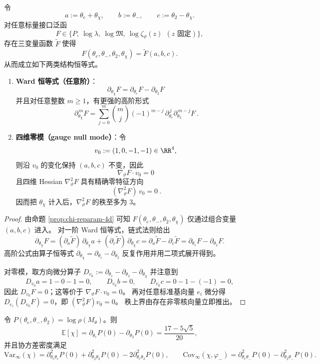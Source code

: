\begin{corollary}\label{cor:chi-gauge-ward-nullmode}
令
$$
a:=\theta_e+\theta_\chi,\qquad b:=\theta_-,\qquad c:=\theta_2-\theta_\chi.
$$
对任意标量接口泛函
$$
F\in\{P,\ \log\lambda,\ \log\mathfrak{M},\ \log\zeta_\vartheta(z)\ \ (\text{$z$ 固定})\},
$$
存在三变量函数 \(\widetilde F\) 使得
$$
F(\theta_e,\theta_-,\theta_2,\theta_\chi)=\widetilde F(a,b,c).
$$
从而成立如下两类结构恒等式。
\begin{enumerate}
  \item \textbf{Ward 恒等式（任意阶）}：
  $$
  \boxed{\ \partial_{\theta_\chi}F=\partial_{\theta_e}F-\partial_{\theta_2}F\ }
  $$
  并且对任意整数 \(m\ge 1\)，有更强的高阶形式
  $$
  \boxed{\ \partial_{\theta_\chi}^{\,m}F
  =\sum_{j=0}^{m}\binom{m}{j}(-1)^{m-j}\,
  \partial_{\theta_e}^{\,j}\partial_{\theta_2}^{\,m-j}F\ }.
  $$
  \item \textbf{四维零模（gauge null mode）}：令
  $$
  v_0:=(1,0,-1,-1)\in\RR^4,
  $$
  则沿 \(v_0\) 的变化保持 \((a,b,c)\) 不变，因此
  $$
  \boxed{\ \nabla_\vartheta F\cdot v_0=0\ }
  $$
  且四维 Hessian \( \nabla_\vartheta^2F \) 具有精确零特征方向
  $$
  \boxed{\ (\nabla_\vartheta^2F)\,v_0=0\ }.
  $$
  因而把 \(\theta_\chi\) 计入后，\(\nabla_\vartheta^2F\) 的秩至多为 \(3\)。
\end{enumerate}
\end{corollary}

\begin{proof}
由命题 \ref{prop:chi-reparam-4d} 可知 \(F(\theta_e,\theta_-,\theta_2,\theta_\chi)\) 仅通过组合变量 \((a,b,c)\) 进入。
对一阶 Ward 恒等式，链式法则给出
$$
\partial_{\theta_\chi}F
=(\partial_a\widetilde F)\,\partial_{\theta_\chi}a+(\partial_c\widetilde F)\,\partial_{\theta_\chi}c
=\partial_a\widetilde F-\partial_c\widetilde F
=\partial_{\theta_e}F-\partial_{\theta_2}F.
$$
高阶公式由算子恒等式 \(\partial_{\theta_\chi}=\partial_{\theta_e}-\partial_{\theta_2}\) 反复作用并用二项式展开得到。
\par
对零模，取方向微分算子
\(
D_{v_0}:=\partial_{\theta_e}-\partial_{\theta_2}-\partial_{\theta_\chi}
\)
并注意到
$$
D_{v_0}a=1-0-1=0,\qquad
D_{v_0}b=0,\qquad
D_{v_0}c=0-1-(-1)=0,
$$
因此 \(D_{v_0}F=0\)；这等价于 \(\nabla_\vartheta F\cdot v_0=0\)。
再对任意标准基向量 \(e_i\) 微分得 \(D_{e_i}(D_{v_0}F)=0\)，即 \((\nabla_\vartheta^2F)v_0=0\)。
秩上界由存在非零核向量立即推出。
\end{proof}

\begin{corollary}\label{cor:chi-moments-from-hessian}
令 $P(\theta_e,\theta_-,\theta_2)=\log\rho(M_\theta)$。则
\[
\mathbb{E}[\chi]=\partial_{\theta_e}P(0)-\partial_{\theta_2}P(0)=\frac{17-5\sqrt5}{20},
\]
并且协方差密度满足
\[
\mathrm{Var}_\infty(\chi)=\partial_{\theta_e\theta_e}^2P(0)+\partial_{\theta_2\theta_2}^2P(0)-2\partial_{\theta_e\theta_2}^2P(0),
\qquad
\mathrm{Cov}_\infty(\chi,\varphi_-)=\partial_{\theta_e\theta_-}^2P(0)-\partial_{\theta_2\theta_-}^2P(0).
\]
\end{corollary}

